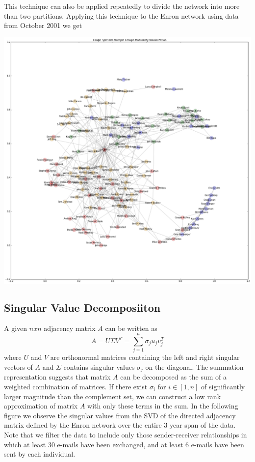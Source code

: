 \documentclass[12pt]{article}
\begin{document}
	This technique can also be applied repeatedly to divide the network into more than two partitions. Applying this technique to the Enron network using data from October 2001 we get
	
	\includegraphics[width=1\textwidth]{figureEnronPartitionMult}



	\subsection{Singular Value Decomposiiton}
		A given $nxn$ adjacency matrix $A$ can be written as
		\begin{equation}
		A = U\Sigma V^T = \sum\limits_{j=1}^n  \sigma_j u_j v_j^T		
		\end{equation}
		where $U$ and $V$ are orthonormal matrices containing the left and right singular vectors of $A$ and $\Sigma$ contains singular values $\sigma_j$ on the diagonal. The summation representation suggests that matrix $A$ can be decomposed as the sum of a weighted combination of matrices. If there exist $\sigma_i$ for $i\in[1,n]$ of significantly larger magnitude than the complement set, we can construct a low rank approximation of matrix $A$ with only these terms in the sum. In the following figure we observe the singular values from the SVD of the directed adjacency matrix defined by the Enron network over the entire 3 year span of the data. Note that we filter the data to include only those sender-receiver relationships in which at least 30 e-mails have been exchanged, and at least 6 e-mails have been sent by each individual.		
\end{document}
